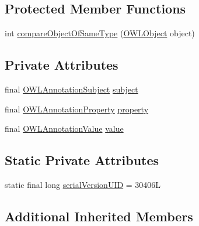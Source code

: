 \subsection*{Protected Member Functions}
\begin{DoxyCompactItemize}
\item 
int \hyperlink{classuk_1_1ac_1_1manchester_1_1cs_1_1owl_1_1owlapi_1_1_o_w_l_annotation_assertion_axiom_impl_a235c3ae548c8c7cce3bf34a1f68985f5}{compare\-Object\-Of\-Same\-Type} (\hyperlink{interfaceorg_1_1semanticweb_1_1owlapi_1_1model_1_1_o_w_l_object}{O\-W\-L\-Object} object)
\end{DoxyCompactItemize}
\subsection*{Private Attributes}
\begin{DoxyCompactItemize}
\item 
final \hyperlink{interfaceorg_1_1semanticweb_1_1owlapi_1_1model_1_1_o_w_l_annotation_subject}{O\-W\-L\-Annotation\-Subject} \hyperlink{classuk_1_1ac_1_1manchester_1_1cs_1_1owl_1_1owlapi_1_1_o_w_l_annotation_assertion_axiom_impl_a62580c2c3611f98a32b3a0cbf7c748a2}{subject}
\item 
final \hyperlink{interfaceorg_1_1semanticweb_1_1owlapi_1_1model_1_1_o_w_l_annotation_property}{O\-W\-L\-Annotation\-Property} \hyperlink{classuk_1_1ac_1_1manchester_1_1cs_1_1owl_1_1owlapi_1_1_o_w_l_annotation_assertion_axiom_impl_a5b58a7cd326fac30a0945a5734dac15d}{property}
\item 
final \hyperlink{interfaceorg_1_1semanticweb_1_1owlapi_1_1model_1_1_o_w_l_annotation_value}{O\-W\-L\-Annotation\-Value} \hyperlink{classuk_1_1ac_1_1manchester_1_1cs_1_1owl_1_1owlapi_1_1_o_w_l_annotation_assertion_axiom_impl_aca80ff59c41f5729c748171c7ef969f9}{value}
\end{DoxyCompactItemize}
\subsection*{Static Private Attributes}
\begin{DoxyCompactItemize}
\item 
static final long \hyperlink{classuk_1_1ac_1_1manchester_1_1cs_1_1owl_1_1owlapi_1_1_o_w_l_annotation_assertion_axiom_impl_a829707d5894e4206ecb0eb53e95fb62f}{serial\-Version\-U\-I\-D} = 30406\-L
\end{DoxyCompactItemize}
\subsection*{Additional Inherited Members}


